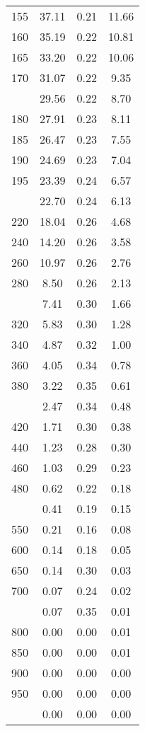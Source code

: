 \begin{table}[ht]
\begin{tabular}{lccc}
  155 & 37.11 & 0.21 & 11.66 \\ 
  160 & 35.19 & 0.22 & 10.81 \\ 
  165 & 33.20 & 0.22 & 10.06 \\ 
  170 & 31.07 & 0.22 & 9.35 \\ 
   \addlinespace
175 & 29.56 & 0.22 & 8.70 \\ 
  180 & 27.91 & 0.23 & 8.11 \\ 
  185 & 26.47 & 0.23 & 7.55 \\ 
  190 & 24.69 & 0.23 & 7.04 \\ 
  195 & 23.39 & 0.24 & 6.57 \\ 
   \addlinespace
200 & 22.70 & 0.24 & 6.13 \\ 
  220 & 18.04 & 0.26 & 4.68 \\ 
  240 & 14.20 & 0.26 & 3.58 \\ 
  260 & 10.97 & 0.26 & 2.76 \\ 
  280 & 8.50 & 0.26 & 2.13 \\ 
   \addlinespace
300 & 7.41 & 0.30 & 1.66 \\ 
  320 & 5.83 & 0.30 & 1.28 \\ 
  340 & 4.87 & 0.32 & 1.00 \\ 
  360 & 4.05 & 0.34 & 0.78 \\ 
  380 & 3.22 & 0.35 & 0.61 \\ 
   \addlinespace
400 & 2.47 & 0.34 & 0.48 \\ 
  420 & 1.71 & 0.30 & 0.38 \\ 
  440 & 1.23 & 0.28 & 0.30 \\ 
  460 & 1.03 & 0.29 & 0.23 \\ 
  480 & 0.62 & 0.22 & 0.18 \\ 
   \addlinespace
500 & 0.41 & 0.19 & 0.15 \\ 
  550 & 0.21 & 0.16 & 0.08 \\ 
  600 & 0.14 & 0.18 & 0.05 \\ 
  650 & 0.14 & 0.30 & 0.03 \\ 
  700 & 0.07 & 0.24 & 0.02 \\ 
   \addlinespace
750 & 0.07 & 0.35 & 0.01 \\ 
  800 & 0.00 & 0.00 & 0.01 \\ 
  850 & 0.00 & 0.00 & 0.01 \\ 
  900 & 0.00 & 0.00 & 0.00 \\ 
  950 & 0.00 & 0.00 & 0.00 \\ 
   \addlinespace
1000 & 0.00 & 0.00 & 0.00 \\ 
   \bottomrule
\end{tabular}
\end{table}
